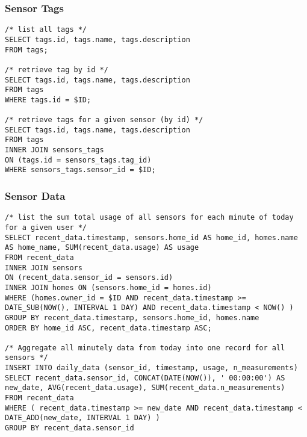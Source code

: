 \documentclass[11pt]{article}
\begin{document}
  \subsubsection{Sensor Tags}
\begin{lstlisting}[style=SQL]
/* list all tags */
SELECT tags.id, tags.name, tags.description
FROM tags;

/* retrieve tag by id */
SELECT tags.id, tags.name, tags.description
FROM tags
WHERE tags.id = $ID;

/* retrieve tags for a given sensor (by id) */
SELECT tags.id, tags.name, tags.description
FROM tags
INNER JOIN sensors_tags
ON (tags.id = sensors_tags.tag_id)
WHERE sensors_tags.sensor_id = $ID;
\end{lstlisting}

  \subsubsection{Sensor Data}
\begin{lstlisting}[style=SQL]
/* list the sum total usage of all sensors for each minute of today for a given user */
SELECT recent_data.timestamp, sensors.home_id AS home_id, homes.name AS home_name, SUM(recent_data.usage) AS usage
FROM recent_data
INNER JOIN sensors
ON (recent_data.sensor_id = sensors.id)
INNER JOIN homes ON (sensors.home_id = homes.id)
WHERE (homes.owner_id = $ID AND recent_data.timestamp >= DATE_SUB(NOW(), INTERVAL 1 DAY) AND recent_data.timestamp < NOW() )
GROUP BY recent_data.timestamp, sensors.home_id, homes.name
ORDER BY home_id ASC, recent_data.timestamp ASC;

/* Aggregate all minutely data from today into one record for all sensors */
INSERT INTO daily_data (sensor_id, timestamp, usage, n_measurements)
SELECT recent_data.sensor_id, CONCAT(DATE(NOW()), ' 00:00:00') AS new_date, AVG(recent_data.usage), SUM(recent_data.n_measurements)
FROM recent_data
WHERE ( recent_data.timestamp >= new_date AND recent_data.timestamp < DATE_ADD(new_date, INTERVAL 1 DAY) )
GROUP BY recent_data.sensor_id

\end{lstlisting}
\end{document}
